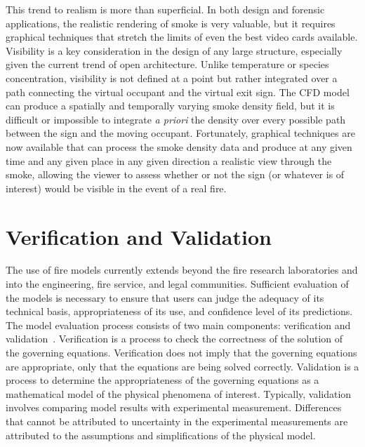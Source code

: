 \documentclass[graybox]{svmult}
\begin{document}
This trend to realism is more than superficial. In both design and forensic applications, the realistic rendering of smoke is very valuable, but it requires graphical techniques that stretch the limits of even the best video cards available. Visibility is a key consideration in the design of any large structure, especially given the current trend of open architecture. Unlike temperature or species concentration, visibility is not defined at a point but rather integrated over a path connecting the virtual occupant and the virtual exit sign. The CFD model can produce a spatially and temporally varying smoke density field, but it is difficult or impossible to integrate {\em a priori} the density over every possible path between the sign and the moving occupant. Fortunately, graphical techniques are now available that can process the smoke density data and produce at any given time and any given place in any given direction a realistic view through the smoke, allowing the viewer to assess whether or not the sign (or whatever is of interest) would be visible in the event of a real fire.






\section{Verification and Validation}

The use of fire models currently extends beyond the fire research laboratories and into the engineering, fire service, and legal communities. Sufficient evaluation of the models is necessary to ensure that users can judge the adequacy of its technical basis, appropriateness of its use, and confidence level of its predictions. The model evaluation process consists of two main components: verification and validation~\cite{SFPE_G.06}. Verification is a process to check the correctness of the solution of the governing equations. Verification does not imply that the governing equations are appropriate, only that the equations are being solved correctly. Validation is a process to determine the appropriateness of the governing equations as a mathematical model of the physical phenomena of interest. Typically, validation involves comparing model results with experimental measurement. Differences that cannot be attributed to uncertainty in the experimental measurements are attributed to the assumptions and simplifications of the physical model.
\end{document}
